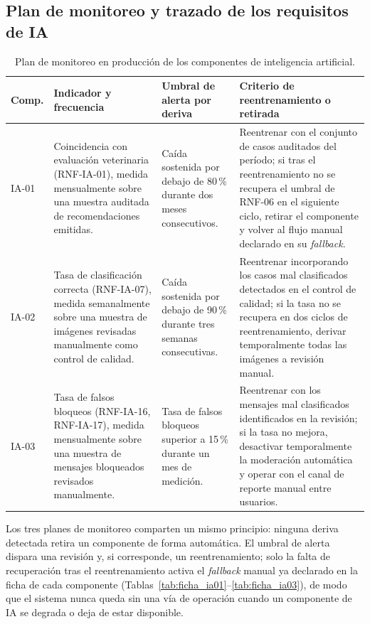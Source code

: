 \documentclass[journal,onecolumn]{IEEEtran}
\begin{document}
\subsection{Plan de monitoreo y trazado de los requisitos de IA}
\label{sec:monitoreo_ia}

\begin{table}[H]
	\caption{Plan de monitoreo en producción de los componentes de inteligencia artificial.}
	\label{tab:monitoreo_ia}
	\small
	\begin{tabularx}{\textwidth}{|L{1.6cm}|X|L{3.0cm}|L{3.6cm}|}
		\hline
		\textbf{Comp.} & \textbf{Indicador y frecuencia} & \textbf{Umbral de alerta por deriva} & \textbf{Criterio de reentrenamiento o retirada} \\
		\hline
		IA-01 & Coincidencia con evaluación veterinaria (RNF-IA-01), medida mensualmente sobre una muestra auditada de recomendaciones emitidas. & Caída sostenida por debajo de 80\,\% durante dos meses consecutivos. & Reentrenar con el conjunto de casos auditados del período; si tras el reentrenamiento no se recupera el umbral de RNF-06 en el siguiente ciclo, retirar el componente y volver al flujo manual declarado en su \textit{fallback}. \\
		\hline
		IA-02 & Tasa de clasificación correcta (RNF-IA-07), medida semanalmente sobre una muestra de imágenes revisadas manualmente como control de calidad. & Caída sostenida por debajo de 90\,\% durante tres semanas consecutivas. & Reentrenar incorporando los casos mal clasificados detectados en el control de calidad; si la tasa no se recupera en dos ciclos de reentrenamiento, derivar temporalmente todas las imágenes a revisión manual. \\
		\hline
		IA-03 & Tasa de falsos bloqueos (RNF-IA-16, RNF-IA-17), medida mensualmente sobre una muestra de mensajes bloqueados revisados manualmente. & Tasa de falsos bloqueos superior a 15\,\% durante un mes de medición. & Reentrenar con los mensajes mal clasificados identificados en la revisión; si la tasa no mejora, desactivar temporalmente la moderación automática y operar con el canal de reporte manual entre usuarios. \\
		\hline
	\end{tabularx}
\end{table}

Los tres planes de monitoreo comparten un mismo principio: ninguna deriva detectada retira un
componente de forma automática. El umbral de alerta dispara una revisión y, si corresponde, un
reentrenamiento; solo la falta de recuperación tras el reentrenamiento activa el \textit{fallback}
manual ya declarado en la ficha de cada componente (Tablas~\ref{tab:ficha_ia01}--\ref{tab:ficha_ia03}),
de modo que el sistema nunca queda sin una vía de operación cuando un componente de IA se
degrada o deja de estar disponible.
\end{document}
